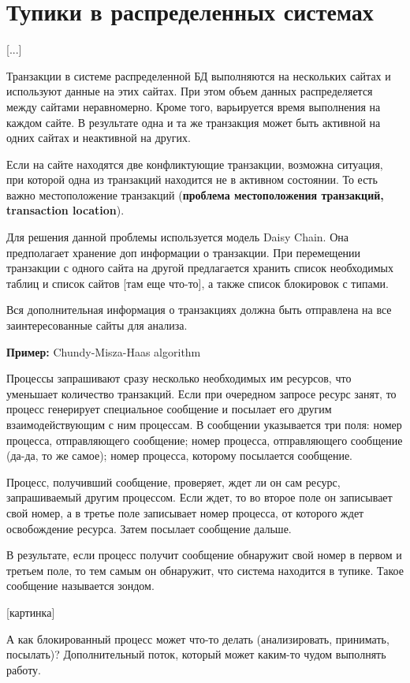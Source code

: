 \documentclass[a4paper, 14pt]{extreport}
\begin{document}
	\chapter{Тупики в распределенных системах}
	
	[...]
	
	Транзакции в системе распределенной БД выполняются на нескольких сайтах и используют данные на этих сайтах. При этом объем данных распределяется между сайтами неравномерно. Кроме того, варьируется время выполнения на каждом сайте. В результате одна и та же транзакция может быть активной на одних сайтах и неактивной на других.
	
	Если на сайте находятся две конфликтующие транзакции, возможна ситуация, при которой одна из транзакций находится не в активном состоянии. То есть важно местоположение транзакций (\textbf{проблема местоположения транзакций, transaction location}).
	
	Для решения данной проблемы используется модель Daisy Chain. Она предполагает хранение доп информации о транзакции. При перемещении транзакции с одного сайта на другой предлагается хранить список необходимых таблиц и список сайтов [там еще что-то], а также список блокировок с типами.
	
	Вся дополнительная информация о транзакциях должна быть отправлена на все заинтересованные сайты для анализа.
	
	\textbf{Пример: } Chundy-Misza-Haas algorithm
	
	Процессы запрашивают сразу несколько необходимых им ресурсов, что уменьшает количество транзакций. Если при очередном запросе ресурс занят, то процесс генерирует специальное сообщение и посылает его другим взаимодействующим с ним процессам. В сообщении указывается три поля: номер процесса, отправляющего сообщение; номер процесса, отправляющего сообщение (да-да, то же самое); номер процесса, которому посылается сообщение.
	
	Процесс, получивший сообщение, проверяет, ждет ли он сам ресурс, запрашиваемый другим процессом. Если ждет, то во второе поле он записывает свой номер, а в третье поле записывает номер процесса, от которого ждет освобождение ресурса. Затем посылает сообщение дальше.
	
	В результате, если процесс получит сообщение обнаружит свой номер в первом и третьем поле, то тем самым он обнаружит, что система находится в тупике. Такое сообщение называется зондом.
	
	[картинка]
	
	А как блокированный процесс может что-то делать (анализировать, принимать, посылать)? Дополнительный поток, который может каким-то чудом выполнять работу.
	
\end{document}
